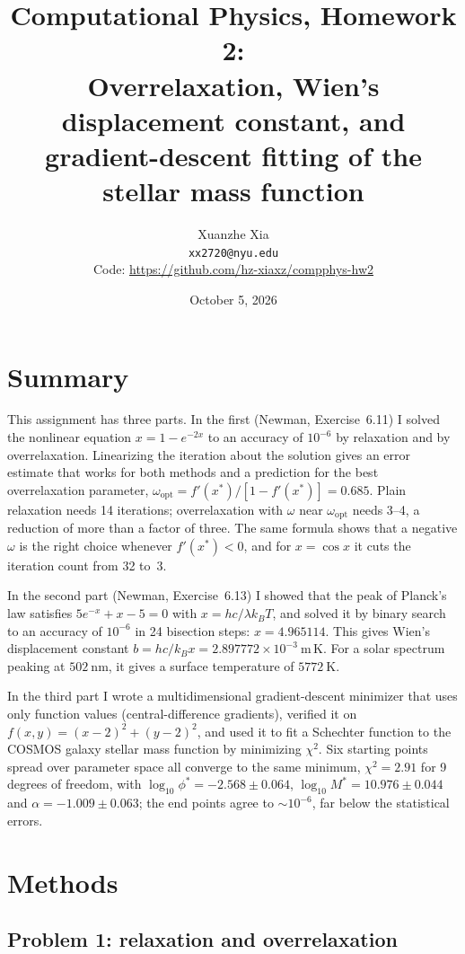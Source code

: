 \documentclass[11pt]{article}
\title{Computational Physics, Homework 2:\\
Overrelaxation, Wien's displacement constant,
and gradient-descent fitting of the stellar mass function}
\author{Xuanzhe Xia \\ \texttt{xx2720@nyu.edu} \\[4pt]
\small Code: \url{https://github.com/hz-xiaxz/compphys-hw2}}
\date{October 5, 2026}
\begin{document}
\maketitle

\section*{Summary}

This assignment has three parts. In the first (Newman, Exercise~6.11) I solved
the nonlinear equation $x = 1-e^{-2x}$ to an accuracy of $10^{-6}$ by relaxation
and by overrelaxation. Linearizing the iteration about the solution gives an
error estimate that works for both methods and a prediction for the best
overrelaxation parameter, $\omega_{\mathrm{opt}} = f'(x^*)/[1-f'(x^*)] = 0.685$.
Plain relaxation needs 14 iterations; overrelaxation with $\omega$ near
$\omega_{\mathrm{opt}}$ needs 3--4, a reduction of more than a factor of three.
The same formula shows that a negative $\omega$ is the right choice whenever
$f'(x^*)<0$, and for $x=\cos x$ it cuts the iteration count from 32 to~3.

In the second part (Newman, Exercise~6.13) I showed that the peak of Planck's
law satisfies $5e^{-x}+x-5=0$ with $x = hc/\lambda k_BT$, and solved it by
binary search to an accuracy of $10^{-6}$ in 24 bisection steps:
$x = 4.965114$. This gives Wien's displacement constant
$b = hc/k_Bx = 2.897772\times10^{-3}\ \mathrm{m\,K}$. For a solar spectrum peaking
at $502\ \mathrm{nm}$, it gives a surface temperature of $5772\ \mathrm{K}$.

In the third part I wrote a multidimensional gradient-descent minimizer that uses
only function values (central-difference gradients), verified it on
$f(x,y) = (x-2)^2+(y-2)^2$, and used it to fit a Schechter function to the COSMOS
galaxy stellar mass function by minimizing $\chi^2$. Six starting points spread
over parameter space all converge to the same minimum, $\chi^2 = 2.91$ for 9
degrees of freedom, with $\log_{10}\phi^* = -2.568\pm0.064$,
$\log_{10}M^* = 10.976\pm0.044$ and $\alpha = -1.009\pm0.063$; the end points
agree to $\sim10^{-6}$, far below the statistical errors.

\section*{Methods}

\subsection*{Problem 1: relaxation and overrelaxation}
\end{document}
